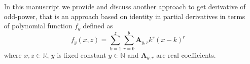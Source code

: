 In this manuscript we provide and discuss another approach to get derivative of odd-power,
that is an approach based on identity in partial derivatives in terms of polynomial function $f_y$ defined as
\[
    f_{y} (x, z) = \sum_{k=1}^{z} \sum_{r=0}^{y} \mathbf{A}_{y,r} k^r (x-k)^r
\]
where $x, z\in \mathbb{R}$, $y$ is fixed constant $y \in \mathbb{N}$ and $\mathbf{A}_{y,r}$ are real coefficients.